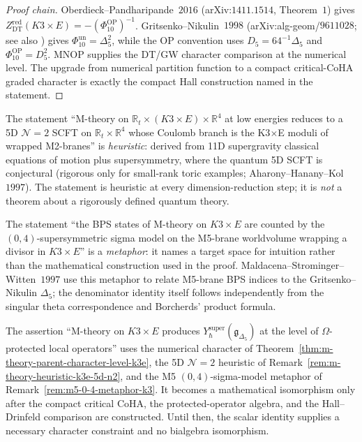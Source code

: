 \begin{proof}[Proof chain]
Oberdieck--Pandharipande~$2016$ (arXiv:$1411.1514$, Theorem~$1$)
gives
\(Z^{\mathrm{red}}_{\mathrm{DT}}(K3\times E)=-(\Phi_{10}^{\mathrm{OP}})^{-1}\).
Gritsenko--Nikulin~$1998$ (arXiv:alg-geom/$9611028$; see also
\cite{GritsenkoNikulin1998}) gives
\(\Phi_{10}^{\mathrm{un}}=\Delta_5^2\), while the OP convention uses
\(D_5=64^{-1}\Delta_5\) and
\(\Phi_{10}^{\mathrm{OP}}=D_5^2\). MNOP supplies the DT/GW character comparison
at the numerical level. The upgrade from numerical partition function
to a compact critical-CoHA graded character is exactly the compact Hall
construction named in the statement.
\end{proof}

\begin{remark}[Physics heuristic: M-theory on $K3 \times E$ to 5D $\mathcal{N} = 2$]
\label{rem:m-theory-heuristic-k3e-5d-n2}
The statement ``M-theory on $\mathbb{R}_t \times (K3 \times E) \times \mathbb{R}^4$ at low energies reduces to a 5D $\mathcal{N} = 2$ SCFT on $\mathbb{R}_t \times \mathbb{R}^4$ whose Coulomb branch is the K3$\times$E moduli of wrapped M2-branes'' is \emph{heuristic}: derived from 11D supergravity classical equations of motion plus supersymmetry, where the quantum 5D SCFT is conjectural (rigorous only for small-rank toric examples; Aharony--Hanany--Kol~$1997$). The statement is heuristic at every dimension-reduction step; it is \emph{not} a theorem about a rigorously defined quantum theory.
\end{remark}

\begin{remark}
\label{rem:m5-0-4-metaphor-k3}
The statement ``the BPS states of M-theory on $K3 \times E$ are counted by the $(0, 4)$-supersymmetric sigma model on the M5-brane worldvolume wrapping a divisor in $K3 \times E$'' is a \emph{metaphor}: it names a target space for intuition rather than the mathematical construction used in the proof. Maldacena--Strominger--Witten~$1997$ use this metaphor to relate M5-brane BPS indices to the Gritsenko--Nikulin $\Delta_5$; the denominator identity itself follows independently from the singular theta correspondence and Borcherds' product formula.
\end{remark}

\begin{remark}
\label{rem:m-theory-synthesis-grade-k3e}
The assertion ``M-theory on $K3 \times E$ produces
\(Y_\hbar^{\mathrm{super}}(\mathfrak{g}_{\Delta_5})\) at the level of
\(\Omega\)-protected local operators'' uses the numerical character of
Theorem~\ref{thm:m-theory-parent-character-level-k3e}, the 5D
\(\mathcal N=2\) heuristic of
Remark~\ref{rem:m-theory-heuristic-k3e-5d-n2}, and the M5
\((0,4)\)-sigma-model metaphor of Remark~\ref{rem:m5-0-4-metaphor-k3}.
It becomes a mathematical isomorphism only after the compact critical
CoHA, the protected-operator algebra, and the Hall--Drinfeld comparison
are constructed. Until then, the scalar identity supplies a necessary
character constraint and no bialgebra isomorphism.
\end{remark}

